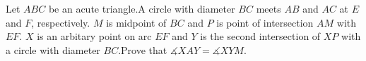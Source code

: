 Let $ABC$ be an acute triangle.A circle with diameter $BC$ meets $AB$ and $AC$ at $E$ and $F$, respectively. $M$ is midpoint of $BC$ and $P$ is point of intersection $AM$ with $EF$. $X$ is an arbitary point on arc $EF$ and $Y$ is the second intersection of $XP$ with a circle with diameter $BC$.Prove that $ \measuredangle XAY=\measuredangle XYM $.